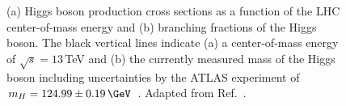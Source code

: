 \begin{figure}
  \begin{center}
  \end{center}
  \caption[Higgs boson production cross sections and decay branching fractions.]{(a) Higgs boson production cross sections as a function of the LHC center-of-mass energy and (b) branching fractions of the Higgs boson. The black vertical lines indicate (a) a center-of-mass energy of $\sqrt{s} = 13\,$TeV and (b) the currently measured mass of the Higgs boson including uncertainties by the ATLAS experiment of $m_H = 124.99 \pm 0.19\,\GeV$~\cite{https://doi.org/10.48550/arxiv.2207.00320}. Adapted from Ref.~\cite{deFlorian:2016spz}.}
\end{figure}

